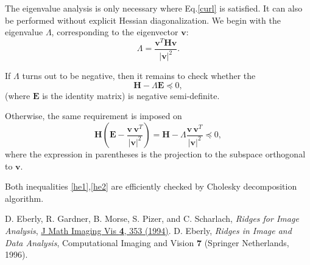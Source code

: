 \documentclass{article}
\begin{document}
The eigenvalue analysis is only necessary where Eq.\eqref{curl} is satisfied. It can also be performed without explicit Hessian diagonalization. We begin with the eigenvalue $\Lambda$, corresponding to the eigenvector $\mathbf{v}$:
\begin{equation}
\Lambda = \frac{\mathbf{v}^T\boldsymbol{H} \mathbf{v}}{\left|\mathbf{v}\right|^2}.
\end{equation}

If $\Lambda$ turns out to be negative, then it remains to check whether the 
\begin{equation}
\label{he1}
\boldsymbol{H} -\Lambda \boldsymbol{E} \preceq 0,
\end{equation}
(where $\boldsymbol{E}$ is the identity matrix) is negative semi-definite. 

Otherwise, the same requirement is imposed on
\begin{equation}
\label{he2}
\boldsymbol{H}\left(\boldsymbol{E} - \frac{\mathbf{v}\,\mathbf{v}^T}{\left|\mathbf{v}\right|^2}\right)=
\boldsymbol{H} - \Lambda \frac{\mathbf{v}\,\mathbf{v}^T}{\left|\mathbf{v}\right|^2}
\preceq 0,
\end{equation}
where the expression in parentheses is the projection to the subspace orthogonal to $\mathbf{v}$.

Both inequalities \eqref{he1},\eqref{he2} are efficiently checked by Cholesky decomposition algorithm.

\begin{thebibliography}{9}
D. Eberly, R. Gardner, B. Morse, S. Pizer, and C. Scharlach,
\textit{Ridges for Image Analysis},
\href{https://doi.org/10.1007/BF01262402}{J Math Imaging Vis \textbf{4}, 353 (1994)}.
D. Eberly,
\textit{Ridges in Image and Data Analysis},
Computational Imaging and Vision \textbf{7} (Springer Netherlands, 1996).
\end{thebibliography}
\end{document}

